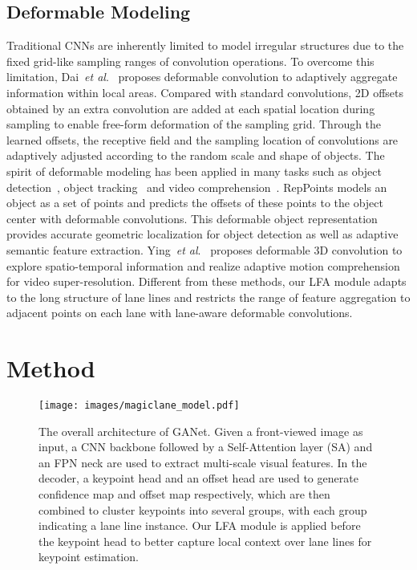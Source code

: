 \documentclass[10pt,twocolumn,letterpaper]{article}
\begin{document}
\subsection{Deformable Modeling}
Traditional CNNs are inherently limited to model irregular structures due to the fixed grid-like sampling ranges of convolution operations.
To overcome this limitation, Dai~\textit{et al}.~\cite{dai2017deformable} proposes deformable convolution to adaptively aggregate information within local areas. Compared with standard convolutions, 2D offsets obtained by an extra convolution are added at each spatial location during sampling to enable free-form deformation of the sampling grid. 
Through the learned offsets, the receptive field and the sampling location of convolutions are adaptively adjusted according to the random scale and shape of objects.
The spirit of deformable modeling has been applied in many tasks such as object detection~\cite{yang2019reppoints,deformabledetr}, object tracking~\cite{yu2020deformable} and video comprehension~\cite{xu2019learning,chen2019temporal,ying2020deformable}.
RepPoints\cite{yang2019reppoints} models an object as a set of points and predicts the offsets of these points to the object center with deformable convolutions. 
This deformable object representation provides accurate geometric localization for object detection as well as adaptive semantic feature extraction.
Ying~\textit{et al}.~\cite{ying2020deformable} proposes deformable 3D convolution to explore spatio-temporal information and realize adaptive motion comprehension for video super-resolution.
Different from these methods, our LFA module adapts to the long structure of lane lines and restricts the range of feature aggregation to adjacent points on each lane with lane-aware deformable convolutions. 


\section{Method}
\label{sec:method}
\begin{figure*}[!t]
    \centering
    \texttt{[image: images/magiclane\_model.pdf]}
    \caption{The overall architecture of GANet. Given a front-viewed image as input, a CNN backbone followed by a Self-Attention layer (SA) and an FPN neck are used to extract multi-scale visual features. 
    In the decoder, a keypoint head and an offset head are used to generate confidence map and offset map respectively, which are then combined to cluster keypoints into several groups, with each group indicating a lane line instance.
    Our LFA module is applied before the keypoint head to better capture local context over lane lines for keypoint estimation.}
    \label{fig:model}
\end{figure*}
\end{document}
